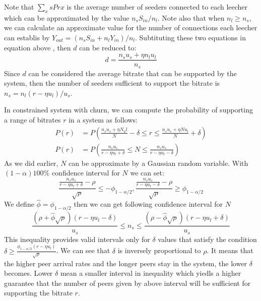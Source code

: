 \documentclass[paper]{ieice}
\begin{document}
Note that $\sum_x s Pr{x}$ is the average number of seeders connected to each leecher which can be approximated by the value $n_s S_{in}/n_l$.
Note also that when $n_l \ge n_s$, we can calculate an approximate value for the number of connections each leecher can establis by $Y_{out} = (n_s S_{in} + n_l Y_{in})/n_l$. 
Subtituting these two equations in equation above , then $d$ can be reduced to:
\begin{equation}
	d = \frac{n_s u_s + \eta n_l u_l}{n_s}
\end{equation}
Since $d$ can be considered the average bitrate that can be supported by the system, then the number of seeders sufficient to support the bitrate is $n_s = n_l (r -\eta u_l) / u_s$. 

In constrained system with churn, we can compute the probability of supporting a range of bitrates $r$ in a system as follows:
\begin{align*}
	P(r) &= P(\frac{n_s u_s + \eta N _ul}{N} - \delta \le r \le \frac{n_s u_s + \eta N u_l}{N}+\delta) \\
	P(r) &= P(\frac{n_s u_s}{r - \eta u_l + \delta} \le N \le \frac{n_s u_s}{r - \eta u_l - \delta})
\end{align*}
As we did earlier, $N$ can be approximate by a Gaussian random variable. 
With $(1-\alpha) 100\%$ confidence interval for $N$ we can set:
\begin{equation*}
	\frac{ \frac{n_s u_s}{r - \eta u_l + \delta} - \rho }{\sqrt{\rho} } \le - \phi_{1-\alpha/2} , \frac{ \frac{n_s u_s}{r - \eta u_l - \delta} - \rho }{\sqrt{\rho} } \ge \phi_{1-\alpha/2}
\end{equation*}
We define $\hat{\phi}=\phi_{1-\alpha/2}$ then we can get following confidence interval for $N$
\begin{equation*}
	\frac{ (\rho + \hat{\phi} \sqrt{\rho} )(r - \eta u_l - \delta)}{u_s} \le n_s \le \frac{ (\rho - \hat{\phi} \sqrt{\rho} )(r - \eta u_l + \delta)}{u_s}
\end{equation*}
This inequality provides valid intervals only for $\delta$ values that satisfy the condition $\delta \ge \frac{\phi_{1-\alpha/2} (r - \eta u_l)}{\sqrt{\rho}}$.
We can see that $\delta$ is inversely  proportional to $\rho$. 
It means that the higher peer arrival rates and the longer peers stay in the system, the lower $\delta$ becomes.
Lower $\delta$ mean a smaller interval in inequality which yiedls a higher guarantee that the number of peers given by above interval will be sufficient for supporting the bitrate $r$. 
\end{document}
